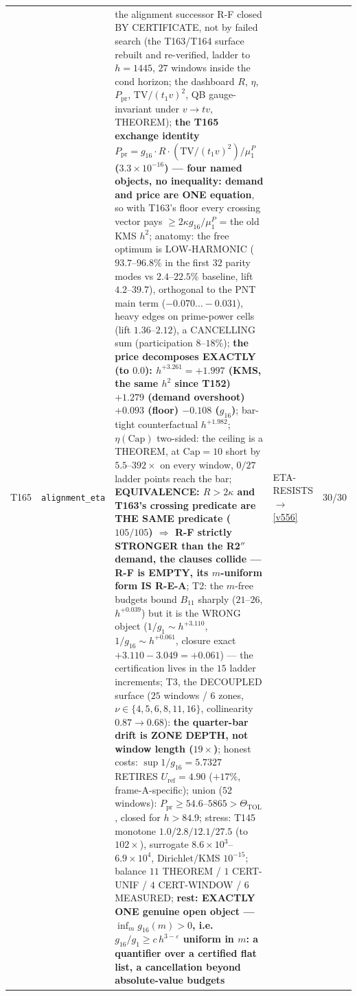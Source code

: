 \documentclass[11pt,a4paper]{article}
\begin{document}
{\begin{xltabular}{\linewidth}{@{}p{0.95cm} >{\raggedright\arraybackslash}p{3.1cm} Y >{\raggedright\scriptsize\arraybackslash}p{3.35cm} p{1.15cm}@{}}
T165 & \texttt{\scriptsize alignment\_\allowbreak eta} & the alignment successor R-F closed BY CERTIFICATE, not by failed search (the T163/T164 surface rebuilt and re-verified, ladder to $h=1445$, $27$ windows inside the cond horizon; the dashboard $R$, $\eta$, $P_{\mathrm{pr}}$, $\mathrm{TV}/(t_1v)^2$, QB gauge-invariant under $v\to tv$, THEOREM); \textbf{the T165 exchange identity $P_{\mathrm{pr}}=g_{16}\cdot R\cdot(\mathrm{TV}/(t_1v)^2)/\mu^P_1$ ($3.3\times10^{-16}$) --- four named objects, no inequality: demand and price are ONE equation}, so with T163's floor every crossing vector pays $\ge2\kappa g_{16}/\mu^P_1$ = the old KMS $h^2$; anatomy: the free optimum is LOW-HARMONIC ($93.7$--$96.8\%$ in the first $32$ parity modes vs $2.4$--$22.5\%$ baseline, lift $4.2$--$39.7$), orthogonal to the PNT main term ($-0.070\ldots-0.031$), heavy edges on prime-power cells (lift $1.36$--$2.12$), a CANCELLING sum (participation $8$--$18\%$); \textbf{the price decomposes EXACTLY (to $0.0$): $h^{+3.261}=+1.997$ (KMS, the same $h^2$ since T152) $+1.279$ (demand overshoot) $+0.093$ (floor) $-0.108$ ($g_{16}$)}; bar-tight counterfactual $h^{+1.982}$; $\eta(\mathrm{Cap})$ two-sided: the ceiling is a THEOREM, at $\mathrm{Cap}=10$ short by $5.5$--$392\times$ on every window, $0/27$ ladder points reach the bar; \textbf{EQUIVALENCE: $R>2\kappa$ and T163's crossing predicate are THE SAME predicate ($105/105$) $\Rightarrow$ R-F strictly STRONGER than the R2$''$ demand, the clauses collide --- R-F is EMPTY, its $m$-uniform form IS R-E-A}; T2: the $m$-free budgets bound $B_{11}$ sharply ($21$--$26$, $h^{+0.039}$) but it is the WRONG object ($1/g_1\sim h^{+3.110}$, $1/g_{16}\sim h^{+0.061}$, closure exact $+3.110-3.049=+0.061$) --- the certification lives in the $15$ ladder increments; T3, the DECOUPLED surface ($25$ windows / $6$ zones, $\nu\in\{4,5,6,8,11,16\}$, collinearity $0.87\to0.68$): \textbf{the quarter-bar drift is ZONE DEPTH, not window length ($19\times$)}; honest costs: $\sup1/g_{16}=5.7327$ RETIRES $U_{\mathrm{ref}}=4.90$ ($+17\%$, frame-A-specific); union ($52$ windows): $P_{\mathrm{pr}}\ge54.6$--$5865>\Theta_{\mathrm{TOL}}$, closed for $h>84.9$; stress: T145 monotone $1.0/2.8/12.1/27.5$ (to $102\times$), surrogate $8.6\times10^{3}$--$6.9\times10^{4}$, Dirichlet/KMS $10^{-15}$; balance $11$ THEOREM / $1$ CERT-UNIF / $4$ CERT-WINDOW / $6$ MEASURED; \textbf{rest: EXACTLY ONE genuine open object --- $\inf_m g_{16}(m)>0$, i.e.\ $g_{16}/g_1\ge c\,h^{3-\varepsilon}$ uniform in $m$: a quantifier over a certified flat list, a cancellation beyond absolute-value budgets} & ETA-RESISTS $\to$ \vref{v556} & 30/30\\

\end{xltabular}}
\end{document}
